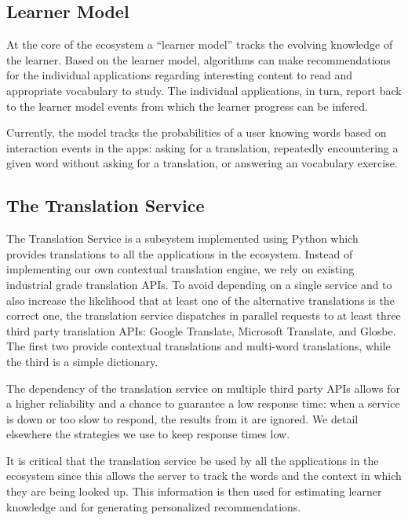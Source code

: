 \subsection{Learner Model}

At the core of the ecosystem a ``learner model'' tracks the evolving knowledge of the learner. 
Based on the learner model, algorithms can make recommendations for the individual applications regarding interesting content to read and appropriate vocabulary to study. The individual applications, in turn, report back to the learner model events from which the learner progress can be infered. 

Currently, the model tracks the probabilities of a user knowing words based on interaction events in the apps: asking for a translation, repeatedly encountering a given word without asking for a translation, or answering an vocabulary exercise.


\subsection{The Translation Service}

The Translation Service is a subsystem implemented using Python which provides translations to all the applications in the ecosystem. Instead of implementing our own contextual translation engine, we rely on existing industrial grade translation APIs. To avoid depending on a single service and to also increase the likelihood that at least one of the alternative translations is the correct one, the translation service dispatches in parallel requests to at least three third party translation APIs: Google Translate, Microsoft Translate, and Glosbe. \cite{Jager17-mux} The first two provide contextual translations and multi-word translations, while the third is a simple dictionary. 

The dependency of the translation service on multiple third party APIs allows for a higher reliability and a chance to guarantee a low response time: when a service is down or too slow to respond, the results from it are ignored. We detail elsewhere the strategies we use to keep response times low\cite{Jager17-mux}.

It is critical that the translation service be used by all the applications in the ecosystem since this allows the server to track the words and the context in which they are being looked up. This information is then used for estimating learner knowledge and for generating personalized recommendations. 


